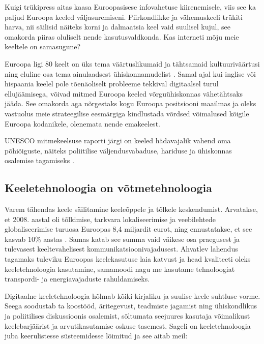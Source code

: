 \begin{multicols}{2}
Kuigi trükipress aitas kaasa Euroopa\-sisese infovahetuse kiirenemisele, viis see ka paljud Euroopa keeled väljasuremiseni.  Piirkondlikke ja vähemuskeeli trükiti harva, nii säilisid näiteks korni ja dalmaatsia keel vaid suulisel kujul, see omakorda piiras oluliselt nende kasutusvaldkonda.  Kas interneti mõju meie keeltele on samasugune?

Euroopa ligi 80 keelt on üks tema väärtuslikumaid ja tähtsamaid kultuuriväärtusi ning eluline osa tema ainulaadsest ühiskonna\-mudelist \cite{EC2}. Samal ajal kui ing\-lise või hispaania keelel pole tõenäoliselt probleeme tekkival digitaalsel turul ellujäämisega, võivad mitmed Euroopa keeled võrguühiskonnas vähetähtsaks jääda.  See omakorda aga nõrgestaks kogu Euroopa positsiooni maailmas ja oleks vastuolus meie strateegilise eesmärgiga kindlustada võrdsed võimalused kõigile Euroopa kodanikele, olenemata nende emakeelest.



UNESCO mitmekeelsuse raporti järgi on keeled hädavajalik vahend oma põhiõiguste, näiteks poliitilise väljendusvabaduse, hariduse ja ühiskonnas osalemise tagamiseks \cite{Unesco1}.

\subsection{Keeletehnoloogia on võtmetehnoloogia}

Varem tähendas keele säilitamine keeleõppele ja tõlkele keskendumist.  Arvatakse, et 2008. aastal oli tõlkimise, tarkvara lokaliseerimise ja veebilehtede globalisee\-ri\-mise turuosa Euroopas 8,4 miljardit {eurot}, ning ennustatakse, et see kasvab 10\% aastas \cite{EC3}. Samas katab see summa vaid väikese osa praegusest ja tulevasest keeltevahelisest kommunikatsioonivajadusest.  Ahvatlev lahendus tagamaks tuleviku Euroopas keelekasutuse laia katvust ja head kvaliteeti oleks keeletehnoloogia kasutamine, samamoodi nagu me kasutame tehnoloogiat transpordi- ja energiavajaduste rahuldamiseks.

Digitaalne keeletehnoloogia hõlmab kõiki kirjaliku ja suulise keele suhtluse vorme.  Seega soodustab ta koostööd, äritegevust, teadmiste jagamist ning ühiskondlikus ja poliitilises diskussioonis osalemist, sõltumata seejuures kasutaja võimalikust keelebarjäärist ja arvutikasutamise oskuse tasemest.  Sageli on keeletehno\-loogia juba keerulistesse süsteemi\-desse lõimitud ja see aitab meil:


\end{multicols}
